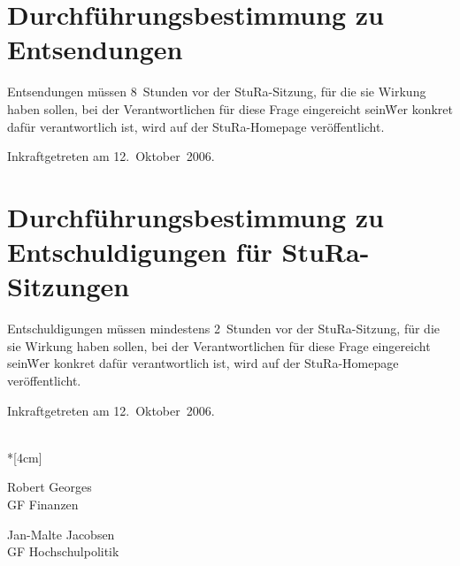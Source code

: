 \setcounter{section}{0} %
\begin{multicols}{2}
 

\section{Durchführungsbestimmung zu Entsendungen}

\setcounter{sentence}{0}

\Satz Entsendungen müssen 8~Stunden vor der StuRa-Sitzung, für die sie Wirkung haben sollen, bei der Verantwortlichen für diese Frage eingereicht sein\. Wer konkret dafür verantwortlich ist, wird auf der StuRa-Homepage veröffentlicht.


\nopagebreak
\vspace{1cm}
Inkraftgetreten am 12.~Oktober~2006.
\\


\section{Durchführungsbestimmung zu Entschuldigungen für StuRa-Sitzungen}

\setcounter{sentence}{0}

\Satz Entschuldigungen müssen mindestens 2~Stunden vor der StuRa-Sitzung, für die sie Wirkung haben sollen, bei der Verantwortlichen für diese Frage eingereicht sein\. Wer konkret dafür verantwortlich ist, wird auf der StuRa-Homepage veröffentlicht.

\nopagebreak
\vspace{1cm}
Inkraftgetreten am 12.~Oktober~2006.
\\


\end{multicols}


\normalsize
~\\*[4cm]
\begin{center}
\hspace*{\fill}
\parbox{7cm}{Robert Georges\\GF Finanzen}
\hfill\parbox{7cm}{Jan-Malte Jacobsen\\GF Hochschulpolitik}
\hspace*{\fill}
\end{center}
